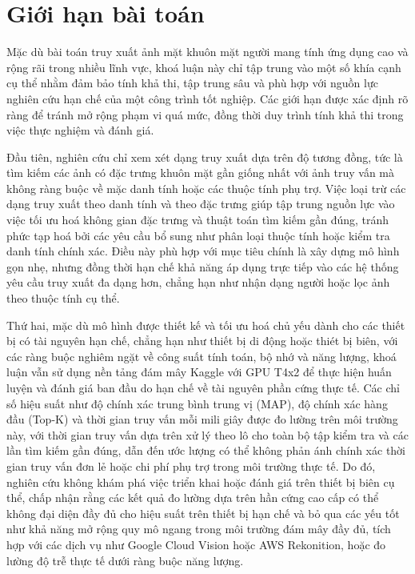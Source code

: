 \section{Giới hạn bài toán}
Mặc dù bài toán truy xuất ảnh mặt khuôn mặt người mang tính ứng dụng cao và rộng rãi trong nhiều lĩnh vực, khoá luận này chỉ tập trung vào một số khía cạnh cụ thể nhằm đảm bảo tính khả thi, tập trung sâu và phù hợp với nguồn lực nghiên cứu hạn chế của một công trình tốt nghiệp. Các giới hạn được xác định rõ ràng để tránh mở rộng phạm vi quá mức, đồng thời duy trình tính khả thi trong việc thực nghiệm và đánh giá.

Đầu tiên, nghiên cứu chỉ xem xét dạng truy xuất dựa trên độ tương đồng, tức là tìm kiếm các ảnh có đặc trưng khuôn mặt gần giống nhất với ảnh truy vấn mà không ràng buộc về mặc danh tính hoặc các thuộc tính phụ trợ. Việc loại trừ các dạng truy xuất theo danh tính và theo đặc trưng giúp tập trung nguồn lực vào việc tối ưu hoá không gian đặc trưng và thuật toán tìm kiếm gần đúng, tránh phức tạp hoá bởi các yêu cầu bổ sung như phân loại thuộc tính hoặc kiểm tra danh tính chính xác. Điều này phù hợp với mục tiêu chính là xây dựng mô hình gọn nhẹ, nhưng đồng thời hạn chế khả năng áp dụng trực tiếp vào các hệ thống yêu cầu truy xuất đa dạng hơn, chẳng hạn như nhận dạng người hoặc lọc ảnh theo thuộc tính cụ thể. 

Thứ hai, mặc dù mô hình được thiết kế và tối ưu hoá chủ yếu dành cho các thiết bị có tài nguyên hạn chế, chẳng hạn như thiết bị di động hoặc thiét bị biên, với các ràng buộc nghiêm ngặt về công suất tính toán, bộ nhớ và năng lượng, khoá luận vẫn sử dụng nền tảng đám mây Kaggle với GPU T4x2 để thực hiện huấn luyện và đánh giá ban đầu do hạn chế về tài nguyên phần cứng thực tế. Các chỉ số hiệu suất như độ chính xác trung bình trung vị (MAP), độ chính xác hàng đầu (Top-K) và thời gian truy vấn mỗi mili giây được đo lường trên môi trường này, với thời gian truy vấn dựa trên xử lý theo lô cho toàn bộ tập kiểm tra và các lần tìm kiếm gần đúng, dẫn đến ước lượng có thể không phản ánh chính xác thời gian truy vấn đơn lẻ hoặc chi phí phụ trợ trong môi trường thực tế. Do đó, nghiên cứu không khám phá việc triển khai hoặc đánh giá trên thiết bị biên cụ thể, chấp nhận rằng các kết quả đo lường dựa trên hần cứng cao cấp có thể không đại diện đầy đủ cho hiệu suất trên thiết bị hạn chế và bỏ qua các yếu tốt như khả năng mở rộng quy mô ngang trong môi trường đám mây đầy đủ, tích hợp với các dịch vụ như Google Cloud Vision hoặc AWS Rekonition, hoặc đo lường độ trễ thực tế dưới ràng buộc năng lượng.

